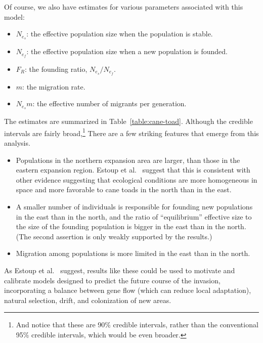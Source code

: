 \documentclass[12pt]{article}
\begin{document}
Of course, we also have estimates for various parameters associated
with this model: 

\begin{itemize}

\item $N_{e_s}$: the effective population size when the population is
  stable.

\item $N_{e_f}$: the effective population size when a new population
  is founded.

\item $F_R$: the founding ratio, $N_{e_s}/N_{e_f}$.

\item $m$: the migration rate.

\item $N_{e_s}m$: the effective number of migrants per generation.

\end{itemize}

The estimates are summarized in Table~\ref{table:cane-toad}. Although
the credible intervals are fairly broad,\footnote{And notice that
  these are 90\% credible intervals, rather than the conventional 95\%
  credible intervals, which would be even broader.} There are a few
striking features that emerge from this analysis.

\begin{itemize}

\item Populations in the northern expansion area are larger, than
  those in the eastern expansion region. Estoup et
  al.~\cite{Estoup-etal-2004} suggest that this is consistent with
  other evidence suggesting that ecological conditions are more
  homogeneous in space and more favorable to cane toads in the north
  than in the east.

\item A smaller number of individuals is responsible for founding new
  populations in the east than in the north, and the ratio of
  ``equilibrium'' effective size to the size of the founding
  population is bigger in the east than in the north. (The second
  assertion is only weakly supported by the results.)

\item Migration among populations is more limited in the east than in
  the north. 

\end{itemize}

As Estoup et al.~\cite{Estoup-etal-2004} suggest, results like these
could be used to motivate and calibrate models designed to predict the
future course of the invasion, incorporating a balance between gene
flow (which can reduce local adaptation), natural selection, drift,
and colonization of new areas.
\end{document}
